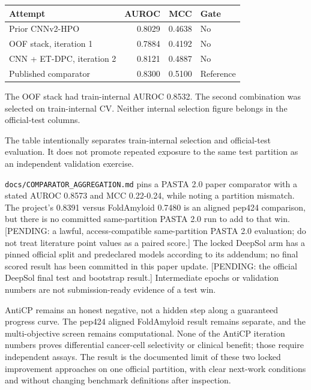 \begin{longtable}[]{@{}lrrl@{}}
\toprule
Attempt & AUROC & MCC & Gate\tabularnewline
\midrule
\endhead
Prior CNNv2-HPO & 0.8029 & 0.4638 & No\tabularnewline
OOF stack, iteration 1 & 0.7884 & 0.4192 & No\tabularnewline
CNN + ET-DPC, iteration 2 & 0.8121 & 0.4887 & No\tabularnewline
Published comparator & 0.8300 & 0.5100 & Reference\tabularnewline
\bottomrule
\end{longtable}

The OOF stack had train-internal AUROC 0.8532. The second combination was selected on train-internal CV. Neither internal selection figure belongs in the official-test columns.

The table intentionally separates train-internal selection and official-test evaluation. It does not promote repeated exposure to the same test partition as an independent validation exercise.


\texttt{docs/COMPARATOR\_AGGREGATION.md} pins a PASTA 2.0 paper comparator with a stated AUROC 0.8573 and MCC 0.22-0.24, while noting a partition mismatch. The project's 0.8391 versus FoldAmyloid 0.7480 is an aligned pep424 comparison, but there is no committed same-partition PASTA 2.0 run to add to that win. {[}PENDING: a lawful, access-compatible same-partition PASTA 2.0 evaluation; do not treat literature point values as a paired score.{]} The locked DeepSol arm has a pinned official split and predeclared models according to its addendum; no final scored result has been committed in this paper update. {[}PENDING: the official DeepSol final test and bootstrap result.{]} Intermediate epochs or validation numbers are not submission-ready evidence of a test win.


AntiCP remains an honest negative, not a hidden step along a guaranteed progress curve. The pep424 aligned FoldAmyloid result remains separate, and the multi-objective screen remains computational. None of the AntiCP iteration numbers proves differential cancer-cell selectivity or clinical benefit; those require independent assays. The result is the documented limit of these two locked improvement approaches on one official partition, with clear next-work conditions and without changing benchmark definitions after inspection.
